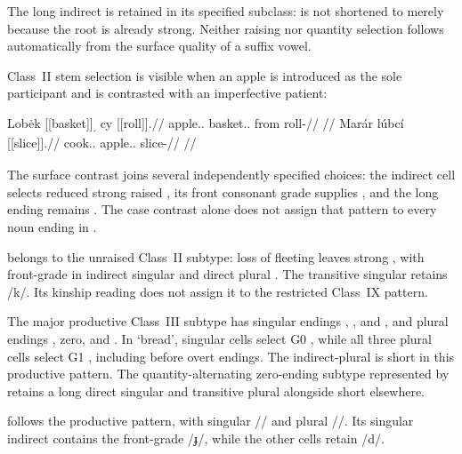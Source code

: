 The long indirect  is retained in its specified subclass:
 is not shortened to  merely because the root
is already strong. Neither raising nor quantity selection follows
automatically from the surface quality of a suffix vowel.

Class~II stem selection is visible when an apple is introduced as the sole
participant and is contrasted with an imperfective patient:

\pex\label{ex:nm-slot-reduced-case}
\a
\begingl
\gla Lobėk \textnormal{[[basket]]}\textsubscript{\Ind{}.\Sg{}} cy \textnormal{[[roll]]}\textsubscript{\Pf{}}.//
\glb apple.\Dir{}.\Sg{} basket.\Ind{}.\Sg{} from roll-\Pf{}//
\glft {} //
\endgl
\a
\begingl
\gla Marár lúbcí \textnormal{[[slice]]}\textsubscript{\Prog{}}.//
\glb cook.\Dir{}.\Sg{} apple.\Ind{}.\Sg{} slice-\Prog{}//
\glft {} //
\endgl
\xe

The surface contrast joins several independently specified choices: the
indirect cell selects reduced strong raised , its front
consonant grade supplies , and the long ending remains
. The case contrast alone does not assign that pattern to every
noun ending in .

  belongs to the unraised Class~II
subtype: loss of fleeting  leaves strong ,
with front-grade  in indirect singular 
and direct plural . The transitive singular
 retains /k/. Its kinship reading does not assign it
to the restricted Class~IX pattern.

The major productive Class~III  subtype has singular endings ,
, and , and plural endings , zero, and .
In  `bread', singular cells select G0 , while all
three plural cells select G1 , including before overt endings.
The indirect-plural  is short in this productive pattern.
The quantity-alternating zero-ending subtype represented by 
retains a long direct singular and transitive plural alongside short
 elsewhere.

  follows the productive 
pattern, with singular //
and plural //. Its singular indirect
 contains the front-grade /ɟ/, while the other cells
retain /d/.


